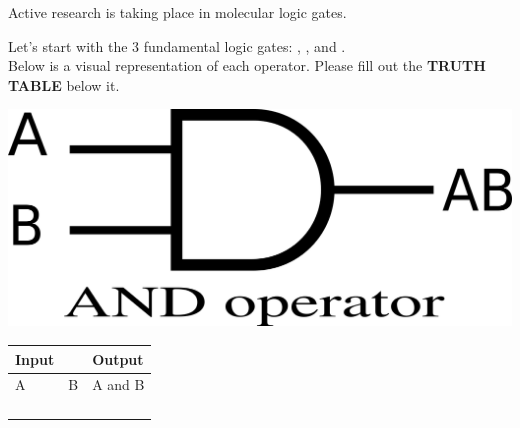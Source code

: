 \documentclass[11pt]{report}
\begin{document}
\vspace{2mm}
\quad Active research is taking place in molecular logic gates.
\vspace{2mm}


\pagebreak

\begin{center}
	Let's start with the 3 fundamental logic gates: , , and  . \\Below is a visual representation of each operator.  Please fill out the \textbf{TRUTH TABLE} below it.
\end{center}


\vspace{20mm}
\hspace{1in}
\begin{minipage}{.5\linewidth}
    \includegraphics[width=3 in]{images/and.png}
	\label{img2}
\end{minipage}
\begin{minipage}{\linewidth}
\begin{tabular}{|ll|l|}
	\hline
	Input                   &   & Output  \\ \hline
	\multicolumn{1}{|l|}{A} & B & A and B \\ \hline
	\multicolumn{1}{|l|}{}  &   &         \\ \hline
	\multicolumn{1}{|l|}{}  &   &         \\ \hline
	\multicolumn{1}{|l|}{}  &   &         \\ \hline
	\multicolumn{1}{|l|}{}  &   &         \\ \hline
\end{tabular}
\end{minipage}
\end{document}
